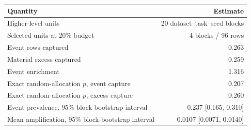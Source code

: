 \begin{tabular}{@{}lr@{}}
\toprule
Quantity & Estimate \\
\midrule
Higher-level units & 20 dataset--task--seed blocks \\
Selected units at 20\% budget & 4 blocks / 96 rows \\
Event rows captured & 0.263 \\
Material excess captured & 0.259 \\
Event enrichment & 1.316 \\
Exact random-allocation $p$, event capture & 0.207 \\
Exact random-allocation $p$, excess capture & 0.260 \\
Event prevalence, 95\% block-bootstrap interval & 0.237 [0.165, 0.310] \\
Mean amplification, 95\% block-bootstrap interval & 0.0107 [0.0071, 0.0140] \\
\bottomrule
\end{tabular}
